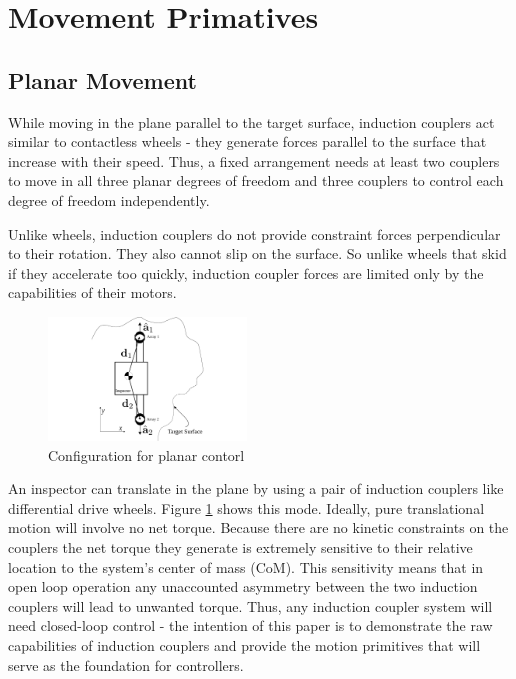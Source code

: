 \documentclass[letterpaper, 10 pt, conference]{ieeeconf}  %
\newcommand{\matt}[1]{{\color{darkgreen}\small\par {[{\bf Matt says:} {\em #1}} ] \\    }}
\begin{document}
\section{Movement Primatives}\label{sec:movements}
\subsection{Planar Movement}\label{sec:planar_movement_desc}
While moving in the plane parallel to the target surface, induction couplers act similar to contactless wheels - they generate forces parallel to the surface that increase with their speed. Thus, a fixed arrangement needs at least two couplers to move in all three planar degrees of freedom and three couplers to control each degree of freedom independently.    
% 

Unlike wheels, induction couplers do not provide constraint forces perpendicular to their rotation.  
They also cannot slip on the surface. So unlike wheels that skid if they accelerate too quickly, induction coupler forces are limited only by the capabilities of their motors. 
%

 
   \begin{figure}[thpb]
      \centering
      \includegraphics[width = 0.47\textwidth]{figures/surface_locomotion.pdf}
      \caption{Configuration for planar contorl}
      \label{fig:planarsetup}
   \end{figure}

 \par An inspector can translate in the plane by using a pair of induction couplers like differential drive wheels. Figure \ref{fig:planarsetup} shows this mode. Ideally, pure translational motion will involve no net torque. Because there are no kinetic constraints on the couplers the net torque they generate is extremely sensitive to their relative location to the system's center of mass (CoM)\label{def:com}. This sensitivity means that in open loop operation any unaccounted asymmetry between the two induction couplers will lead to unwanted torque. Thus, any induction coupler system will need closed-loop control - the intention of this paper is to demonstrate the raw capabilities of induction couplers and provide the motion primitives that will serve as the foundation for controllers.
\end{document}
